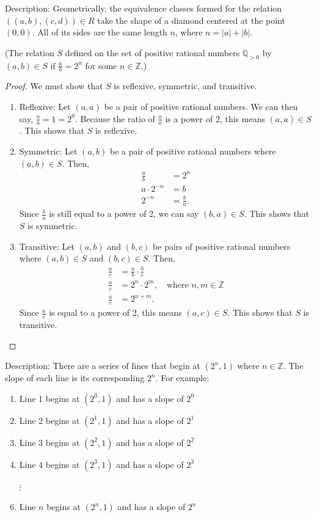 \documentclass[11pt]{article}
\renewcommand\part[1]{\vspace{.10in}(#1)\par}
\newcommand{\Z}{\mathbb{Z}}
\newcommand{\Q}{\mathbb{Q}}
\begin{document}
Description: Geometrically, the equivalence classes formed for the relation $((a,b),(c,d)) \in R$ take the shape of a diamond centered at the point $(0,0)$. All of its sides are the same length $n$, where $n = |a| + |b|$.

\part{The relation $S$ defined on the set of positive rational numbers $\Q_{>0}$ by $(a,b) \in S \text{ if } \frac{a}{b}= 2^n$ for some $n \in \Z$.}

\begin{proof}
	We must show that $S$ is reflexive, symmetric, and transitive.
	\begin{enumerate}
		\item Reflexive: Let $(a,a)$ be a pair of positive rational numbers. We can then say, $\frac{a}{a} = 1 = 2^0$. Because the ratio of $\frac{a}{a}$ is a power of 2, this means $(a,a) \in S$. This shows that $S$ is reflexive.

		\item Symmetric: Let $(a,b)$ be a pair of positive rational numbers where $(a,b) \in S$. Then,
			\begin{align*}
				\frac{a}{b} &= 2^n\\
				a \cdot 2^{-n} &= b\\
				2^{-n} &= \frac{b}{a}.
			\end{align*}
			Since $\frac{b}{a}$ is still equal to a power of 2, we can say $(b,a) \in S$. This shows that $S$ is symmetric.

		\item Transitive: Let $(a,b)$ and $(b,c)$ be pairs of positive rational numbers where $(a,b) \in S$ and $(b,c) \in S$. Then,
			\begin{align*}
				\frac{a}{c} &= \frac{a}{b} \cdot \frac{b}{c}\\
				\frac{a}{c} &= 2^n \cdot 2^m, \quad \text{where $n,m \in \Z$}\\
				\frac{a}{c} &= 2^{n+m}.
			\end{align*}
			Since $\frac{a}{c}$ is equal to a power of 2, this means $(a,c) \in S$. This shows that $S$ is transitive.
	\end{enumerate}
\end{proof}

Description: There are a series of lines that begin at $(2^n, 1)$ where $n \in \Z$. The slope of each line is its corresponding $2^n$. For example:
\begin{enumerate}[label=\arabic*:]
 	\item Line 1 begins at $(2^0,1)$ and has a slope of $2^0$
 	\item Line 2 begins at $(2^1, 1)$ and has a slope of $2^1$
 	\item Line 3 begins at $(2^2, 1)$ and has a slope of $2^2$
 	\item Line 4 begins at $(2^3,1)$ and has a slope of $2^3$
 	\item[{$\vdots$}]
 	\item Line $n$ begins at $(2^n, 1)$ and has a slope of $2^n$
 \end{enumerate}
\end{document}
